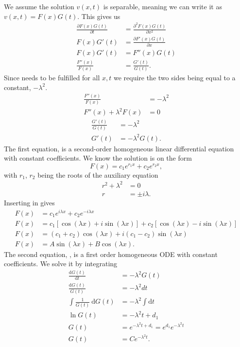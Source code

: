 We assume the solution $v(x,t)$ is separable, meaning we can write it as
$v(x,t) = F(x)G(t)$.
This gives us
%
\begin{align}
	\frac{\partial F(x)G(t)}{\partial t} &= \frac{\partial^2 F(x)G(t)}{\partial
	x^2} \nonumber \\
	F(x)G'(t) &= \frac{\partial F'(x)G(t)}{\partial x} \nonumber \\
	F(x)G'(t) &= F''(x)G(t) \nonumber \\
	\frac{F''(x)}{F(x)} &= \frac{G'(t)}{G(t)}.
	\label{eq:separate}
\end{align}
%
Since  needs to be fulfilled for all $x,t$ we require the two
sides being equal to a constant, $-\lambda^2$.
%
\begin{align}
	\frac{F''(x)}{F(x)} &= -\lambda^2 \nonumber \\
	F''(x) + \lambda^2F(x) &= 0
	\label{eq:sepF}
\end{align}
%
\begin{align}
	\frac{G'(t)}{G(t)} &= -\lambda^2 \nonumber \\
	G'(t) &= -\lambda^2G(t).
	\label{eq:sepG}
\end{align}
%
The first equation,  is a second-order homogeneous linear
differential equation with constant coefficients. We know the solution is on the
form
%
\begin{equation}
	F(x) = c_1e^{r_1x} + c_2e^{r_2x},
	\label{eq:F}
\end{equation}
%
with $r_1$, $r_2$ being the roots of the auxiliary equation
%
\begin{align}
	r^2 + \lambda^2 &= 0 \nonumber \\
	r &= \pm i\lambda. \label{eq:roots}
\end{align}
%
Inserting  in  gives
%
\begin{align*}
	F(x) &= c_1e^{i\lambda x} + c_2e^{-i\lambda x} \\
	F(x) &= c_1\left[ \cos{(\lambda x)} + i\sin{(\lambda x)} \right] + c_2\left[
	\cos{(\lambda x)} - i\sin{(\lambda x)} \right] \\
	F(x) &= (c_1 + c_2)\cos{(\lambda x)} + i(c_1 - c_2)\sin{(\lambda x)} \\
	F(x) &= A\sin{(\lambda x)} + B\cos{(\lambda x)}.
\end{align*}
%
The second equation, , is a first order homogeneous ODE with
constant coefficients. We solve it by integrating
%
\begin{align*}
	\frac{\mathrm{d}G(t)}{\mathrm{d}t} &= -\lambda^2 G(t) \\
	\frac{\mathrm{d}G(t)}{G(t)} &= - \lambda^2 dt \\
	\int \frac{1}{G(t)} \ \mathrm{d}G(t) &= -\lambda^2 \int \mathrm{d}t \\
	\ln{G(t)} &= -\lambda^2 t + d_1 \\
	G(t) &= e^{-\lambda^2 t + d_1} = e^{d_1}e^{-\lambda^2 t} \\
	G(t) &= Ce^{-\lambda^2 t}.
\end{align*}
